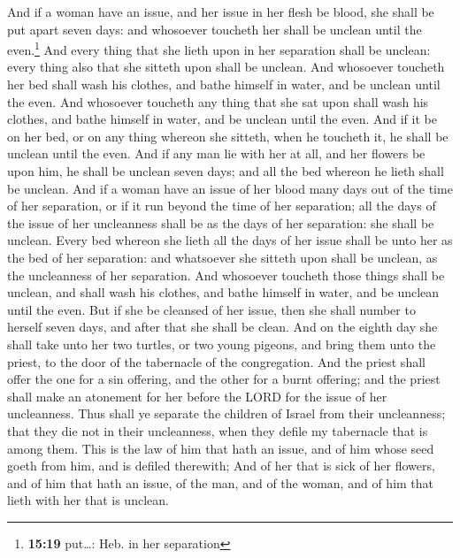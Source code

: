  And if a woman have an issue, and her issue in her flesh
be blood, she shall be put apart seven days: and whosoever toucheth her
shall be unclean until the even.\footnote{\textbf{15:19} put\ldots: Heb.
  in her separation}  And every thing that she lieth upon
in her separation shall be unclean: every thing also that she sitteth
upon shall be unclean.  And whosoever toucheth her bed
shall wash his clothes, and bathe himself in water, and be unclean until
the even.  And whosoever toucheth any thing that she sat
upon shall wash his clothes, and bathe himself in water, and be unclean
until the even.  And if it be on her bed, or on any thing
whereon she sitteth, when he toucheth it, he shall be unclean until the
even.  And if any man lie with her at all, and her
flowers be upon him, he shall be unclean seven days; and all the bed
whereon he lieth shall be unclean.  And if a woman have
an issue of her blood many days out of the time of her separation, or if
it run beyond the time of her separation; all the days of the issue of
her uncleanness shall be as the days of her separation: she shall be
unclean.  Every bed whereon she lieth all the days of her
issue shall be unto her as the bed of her separation: and whatsoever she
sitteth upon shall be unclean, as the uncleanness of her separation.
 And whosoever toucheth those things shall be unclean,
and shall wash his clothes, and bathe himself in water, and be unclean
until the even.  But if she be cleansed of her issue,
then she shall number to herself seven days, and after that she shall be
clean.  And on the eighth day she shall take unto her two
turtles, or two young pigeons, and bring them unto the priest, to the
door of the tabernacle of the congregation.  And the
priest shall offer the one for a sin offering, and the other for a burnt
offering; and the priest shall make an atonement for her before the LORD
for the issue of her uncleanness.  Thus shall ye separate
the children of Israel from their uncleanness; that they die not in
their uncleanness, when they defile my tabernacle that is among them.
 This is the law of him that hath an issue, and of him
whose seed goeth from him, and is defiled therewith;  And
of her that is sick of her flowers, and of him that hath an issue, of
the man, and of the woman, and of him that lieth with her that is
unclean.

